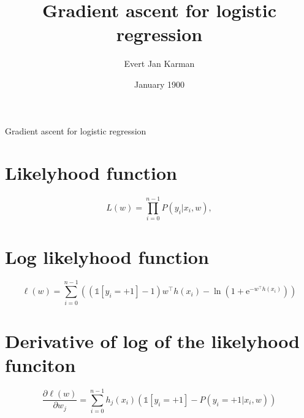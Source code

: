 \documentclass[12pt, letterpaper]{article}
\title{Gradient ascent for logistic regression}
\author{Evert Jan Karman}
\date{January 1900}
\begin{document}
\maketitle

Gradient ascent for logistic regression

\section{Likelyhood function}

\[
L(w)
= \prod_{i=0}^{n-1} P(y_i | x_i, w),
\]

\section{Log likelyhood function}
\[
\ell(w)
= \sum_{i=0}^{n-1} ( ( \mathds{1}[y_i=+1] - 1) w^\top h(x_i) - \ln ( 1 + \mathrm{e}^{-w^\top h(x_i)} ) )
\]


\section{Derivative of log of the likelyhood funciton}

\[
\frac{\partial \ell(w)}{\partial w_j} = \sum_{i=0}^{n-1} h_j(x_i) ( \mathds{1}[y_i=+1] - P(y_i=+1 | x_i,w))
\]
\end{document}
